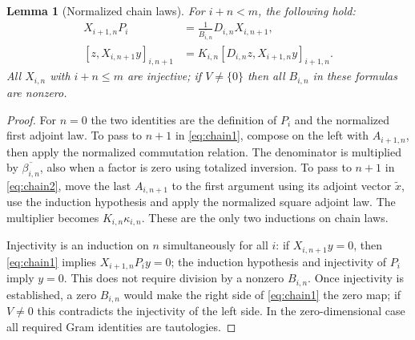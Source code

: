 \documentclass[11pt]{article}
\newtheorem{lemma}[theorem]{Lemma}
\begin{document}
\begin{lemma}[Normalized chain laws]\label{lem:chain}
For $i+n<m$, the following hold:
\begin{align}
 X_{i+1,n}P_i&=\frac{1}{\overline{B_{i,n}}}D_{i,n}X_{i,n+1},\label{eq:chain1}\\
 [z,X_{i,n+1}y]_{i,n+1}
 &=K_{i,n}[D_{i,n}z,X_{i+1,n}y]_{i+1,n}.\label{eq:chain2}
\end{align}
All $X_{i,n}$ with $i+n\le m$ are injective; if $V\ne\{0\}$ then all $B_{i,n}$ in these formulas are nonzero.
\end{lemma}
\begin{proof}
For $n=0$ the two identities are the definition of $P_i$ and the normalized first adjoint law. To pass to $n+1$ in \eqref{eq:chain1}, compose on the left with $A_{i+1,n}$, then apply the normalized commutation relation. The denominator is multiplied by $\overline{\beta_{i,n}}$, also when a factor is zero using totalized inversion. To pass to $n+1$ in \eqref{eq:chain2}, move the last $A_{i,n+1}$ to the first argument using its adjoint vector $\widetilde x$, use the induction hypothesis and apply the normalized square adjoint law. The multiplier becomes $K_{i,n}\kappa_{i,n}$. These are the only two inductions on chain laws.

Injectivity is an induction on $n$ simultaneously for all $i$: if $X_{i,n+1}y=0$, then \eqref{eq:chain1} implies $X_{i+1,n}P_i y=0$; the induction hypothesis and injectivity of $P_i$ imply $y=0$. This does not require division by a nonzero $B_{i,n}$. Once injectivity is established, a zero $B_{i,n}$ would make the right side of \eqref{eq:chain1} the zero map; if $V\ne0$ this contradicts the injectivity of the left side. In the zero-dimensional case all required Gram identities are tautologies.
\end{proof}
\end{document}
